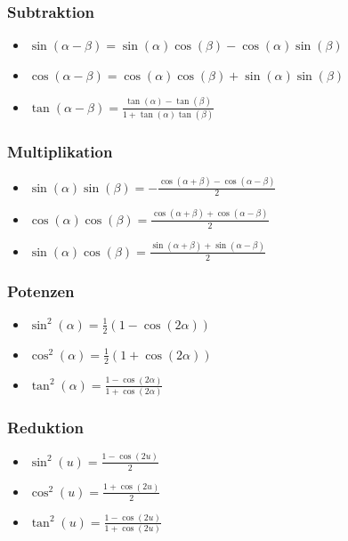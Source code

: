 \documentclass[7pt,landscape, margin = 0.1mm]{article}
\begin{document}
\begin{multicols}{4}
\subsubsection{Subtraktion}
\begin{itemize}
 \item $\sin(\alpha - \beta) = \sin(\alpha) \cos(\beta) - \cos(\alpha)\sin(\beta)$
 \item $\cos(\alpha - \beta) = \cos(\alpha) \cos(\beta) + \sin(\alpha)\sin(\beta)$
 \item $\tan(\alpha - \beta) = \frac{\tan(\alpha) - \tan(\beta)}{1+\tan(\alpha) \tan(\beta)}$
\end{itemize}

\subsubsection{Multiplikation}
\begin{itemize}
 \item $\sin(\alpha) \sin(\beta) = -\frac{\cos(\alpha + \beta) - \cos(\alpha - \beta)}{2}$
 \item $\cos(\alpha) \cos(\beta) =  \frac{\cos(\alpha + \beta) + \cos(\alpha - \beta)}{2}$
 \item $\sin(\alpha) \cos(\beta) =  \frac{\sin(\alpha + \beta) + \sin(\alpha - \beta)}{2}$
\end{itemize}

\subsubsection{Potenzen}
\begin{itemize}
 \item $\sin^2(\alpha) = \frac{1}{2}(1-\cos(2\alpha))$
 \item $\cos^2(\alpha) = \frac{1}{2}(1+\cos(2\alpha))$
 \item $\tan^2(\alpha) = \frac{1-\cos(2\alpha)}{1+\cos(2\alpha)}$
\end{itemize}

\subsubsection{Reduktion}
\begin{itemize}
\item $\sin^2(u) = \frac{1-\cos(2u)}{2}$
\item $\cos^2(u) = \frac{1+\cos(2u)}{2}$
\item $\tan^2(u) = \frac{1-\cos(2u)}{1+\cos(2u)}$


\end{itemize}
\end{multicols}
\end{document}
